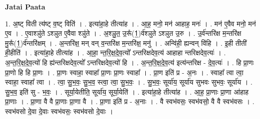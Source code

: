 \documentclass[17pt]{extarticle}
\begin{document}
\textbf{Jatai Paata} \newline

1. अ॒ष्ट् विती त्य॑ष्ट् व॒ष्ट् विति॑ । . इत्या॑हा॒हे तीत्या॑ह । . आ॒ह॒ मनो॒ मन॑ आहाह॒ मनः॑ । . मन॑ ए॒वैव मनो॒ मन॑ ए॒व । . ए॒वाश्ञु॑ते ऽश्ञुत ए॒वैवा श्ञु॑ते । . अ॒श्ञु॒त॒ उ॒रू᳚(1॒)र्व॑श्ञुते ऽश्ञुत उ॒रु । . उ॒र्व॑न्तरि॑क्ष म॒न्तरि॑क्ष मु॒रू᳚(1॒)र्व॑न्तरि॑क्षम् । . अ॒न्तरि॑क्ष॒ मन् वन् व॒न्तरि॑क्ष म॒न्तरि॑क्ष॒ मनु॑ । . अन्वि॑ही॒ ह्यन्वन् वि॑हि । . इ॒ही तीती॑ ही॒हीति॑ । . इत्या॑हा॒हे तीत्या॑ह । . आ॒हा॒ न्त॒रि॒क्ष॒दे॒व॒त्यो᳚ ऽन्तरिक्षदेव॒त्य॑ आहाहा न्तरिक्षदेव॒त्यः॑ । . अ॒न्त॒रि॒क्ष॒दे॒व॒त्यो॑ हि ह्य॑न्तरिक्षदेव॒त्यो᳚ ऽन्तरिक्षदेव॒त्यो॑ हि । . अ॒न्त॒रि॒क्ष॒दे॒व॒त्य॑ इत्य॑न्तरिक्ष - दे॒व॒त्यः॑ । . हि प्रा॒णः प्रा॒णो हि हि प्रा॒णः । . प्रा॒णः स्वाहा॒ स्वाहा᳚ प्रा॒णः प्रा॒णः स्वाहा᳚ । . प्रा॒ण इति॑ प्र - अ॒नः । . स्वाहा᳚ त्वा त्वा॒ स्वाहा॒ स्वाहा᳚ त्वा । . त्वा॒ सु॒भ॒वः॒ सु॒भ॒व॒ स्त्वा॒ त्वा॒ सु॒भ॒वः॒ । . सु॒भ॒वः॒ सूर्या॑य॒ सूर्या॑य सुभवः सुभवः॒ सूर्या॑य । . सु॒भ॒व॒ इति॑ सु - भ॒वः॒ । . सूर्या॒येतीति॒ सूर्या॑य॒ सूर्या॒येति॑ । . इत्या॑हा॒हे तीत्या॑ह । . आ॒ह॒ प्रा॒णाः प्रा॒णा आ॑हाह प्रा॒णाः । . प्रा॒णा वै वै प्रा॒णाः प्रा॒णा वै । . प्रा॒णा इति॑ प्र - अ॒नाः । . वै स्वभ॑वसः॒ स्वभ॑वसो॒ वै वै स्वभ॑वसः । . स्वभ॑वसो दे॒वा दे॒वाः स्वभ॑वसः॒ स्वभ॑वसो दे॒वाः । \newline
\end{document}
